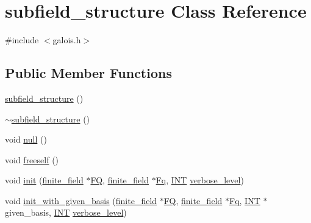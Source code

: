 \hypertarget{classsubfield__structure}{}\section{subfield\+\_\+structure Class Reference}
\label{classsubfield__structure}


{\ttfamily \#include $<$galois.\+h$>$}

\subsection*{Public Member Functions}
\begin{DoxyCompactItemize}
\item 
\mbox{\hyperlink{classsubfield__structure_a8dae6eee2359083b8ebf4b492edcdec1}{subfield\+\_\+structure}} ()
\item 
\mbox{\hyperlink{classsubfield__structure_a278621ea2ea96d59611987a570dd6bc5}{$\sim$subfield\+\_\+structure}} ()
\item 
void \mbox{\hyperlink{classsubfield__structure_a055260480ba8b8d9ec922824f57e7de2}{null}} ()
\item 
void \mbox{\hyperlink{classsubfield__structure_a6a9725c48929a32427696af14ef69440}{freeself}} ()
\item 
void \mbox{\hyperlink{classsubfield__structure_a726b7657e56b87f2003a18392fa687a4}{init}} (\mbox{\hyperlink{classfinite__field}{finite\+\_\+field}} $\ast$\mbox{\hyperlink{classsubfield__structure_a91f0dd50b7b9398cc86c931c4a71ca80}{FQ}}, \mbox{\hyperlink{classfinite__field}{finite\+\_\+field}} $\ast$\mbox{\hyperlink{classsubfield__structure_a65d0344e1060380d3484f19147683dba}{Fq}}, \mbox{\hyperlink{galois_8h_a09fddde158a3a20bd2dcadb609de11dc}{I\+NT}} \mbox{\hyperlink{simeon_8_c_a818073fbcc2f439e7c56952f67386122}{verbose\+\_\+level}})
\item 
void \mbox{\hyperlink{classsubfield__structure_ac6d44abb857dd6eb3a2d34d750f061a9}{init\+\_\+with\+\_\+given\+\_\+basis}} (\mbox{\hyperlink{classfinite__field}{finite\+\_\+field}} $\ast$\mbox{\hyperlink{classsubfield__structure_a91f0dd50b7b9398cc86c931c4a71ca80}{FQ}}, \mbox{\hyperlink{classfinite__field}{finite\+\_\+field}} $\ast$\mbox{\hyperlink{classsubfield__structure_a65d0344e1060380d3484f19147683dba}{Fq}}, \mbox{\hyperlink{galois_8h_a09fddde158a3a20bd2dcadb609de11dc}{I\+NT}} $\ast$given\+\_\+basis, \mbox{\hyperlink{galois_8h_a09fddde158a3a20bd2dcadb609de11dc}{I\+NT}} \mbox{\hyperlink{simeon_8_c_a818073fbcc2f439e7c56952f67386122}{verbose\+\_\+level}})

\end{DoxyCompactItemize}
